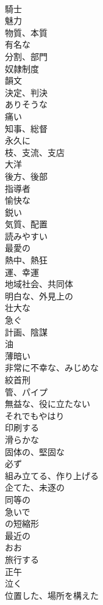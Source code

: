 \documentclass[8pt]{extreport}
\begin{document}
\begin{CJK}{UTF8}{min}
\\	騎士
\\	魅力
\\	物質、本質
\\	有名な
\\	分割、部門
\\	奴隷制度
\\	韻文
\\	決定、判決
\\	ありそうな
\\	痛い
\\	知事、総督
\\	永久に
\\	枝、支流、支店
\\	大洋
\\	後方、後部
\\	指導者
\\	愉快な
\\	鋭い
\\	気質、配置
\\	読みやすい
\\	最愛の
\\	熱中、熱狂
\\	運、幸運
\\	地域社会、共同体
\\	明白な、外見上の
\\	壮大な
\\	急ぐ
\\	計画、陰謀
\\	油
\\	薄暗い
\\	非常に不幸な、みじめな
\\	絞首刑
\\	管、パイプ
\\	無益な、役に立たない
\\	それでもやはり
\\	印刷する
\\	滑らかな
\\	固体の、堅固な
\\	必ず
\\	組み立てる、作り上げる
\\	企てた、未逐の
\\	同等の
\\	急いで
\\	の短縮形
\\	最近の
\\	おお
\\	旅行する
\\	正午
\\	泣く
\\	位置した、場所を構えた

\end{CJK}
\end{document}
